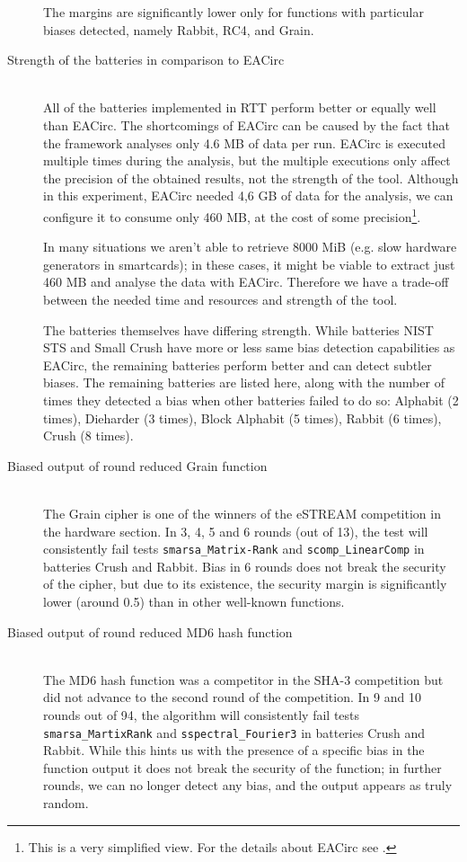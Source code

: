 \documentclass[
	digital,    %
	oneside,
	color,
	11pt,
	nocover,
	notable,
	nolof,
	nolot,
]{fithesis3}
\theoremstyle{definition}
\theoremstyle{remark}
\begin{document}
\begin{description}
The margins are significantly lower only for functions with particular biases detected, namely Rabbit, RC4, and Grain.

\item[Strength of the batteries in comparison to EACirc] \hfill \\
All of the batteries implemented in RTT perform better or equally well than EACirc. The shortcomings of EACirc can be caused by the fact that the framework analyses only 4.6 MB of data per run. EACirc is executed multiple times during the analysis, but the multiple executions only affect the precision of the obtained results, not the strength of the tool. Although in this experiment, EACirc needed 4,6 GB of data for the analysis, we can configure it to consume only 460 MB, at the cost of some precision\footnote{This is a very simplified view. For the details about EACirc see \cite{kubicek-dp}.}. 

In many situations we aren't able to retrieve 8000 MiB (e.g. slow hardware generators in smartcards); in these cases, it might be viable to extract just 460 MB and analyse the data with EACirc. Therefore we have a trade-off between the needed time and resources and strength of the tool.

The batteries themselves have differing strength. While batteries NIST STS and Small Crush have more or less same bias detection capabilities as EACirc, the remaining batteries perform better and can detect subtler biases. The remaining batteries are listed here, along with the number of times they detected a bias when other batteries failed to do so: Alphabit (2 times), Dieharder (3 times), Block Alphabit (5 times), Rabbit (6 times), Crush (8 times).

\item[Biased output of round reduced Grain function] \hfill \\
The Grain cipher \cite{grain} is one of the winners of the eSTREAM competition in the hardware section. In 3, 4, 5 and 6 rounds (out of 13), the test will consistently fail tests \texttt{smarsa\_Matrix-\linebreak Rank} and \texttt{scomp\_LinearComp} in batteries Crush and Rabbit.  Bias in 6 rounds does not break the security of the cipher, but due to its existence, the security margin is significantly lower (around 0.5) than in other well-known functions. 

\item[Biased output of round reduced MD6 hash function] \hfill \\
The MD6 hash function \cite{md6} was a competitor in the SHA-3 competition but did not advance to the second round of the competition. In 9 and 10 rounds out of 94, the algorithm will consistently fail tests \texttt{smarsa\_MartixRank} and \texttt{sspectral\_Fourier3} in batteries Crush and Rabbit. While this hints us with the presence of a specific bias in the function output it does not break the security of the function; in further rounds, we can no longer detect any bias, and the output appears as truly random.

\end{description}
\end{document}
